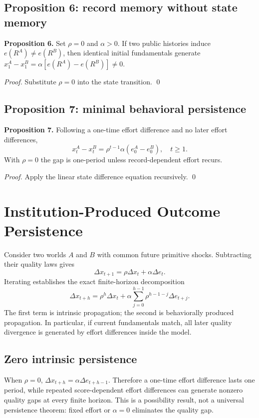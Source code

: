 \subsection{Proposition 6: record memory without state memory}
\textbf{Proposition 6.} Set $\rho=0$ and $\alpha>0$. If two public histories induce $e(R^A)\ne e(R^B)$, then identical initial fundamentals generate $x_1^A-x_1^B=\alpha[e(R^A)-e(R^B)]\ne0$.

\textit{Proof.} Substitute $\rho=0$ into the state transition. \qed

\subsection{Proposition 7: minimal behavioral persistence}
\textbf{Proposition 7.} Following a one-time effort difference and no later effort differences,
\[
x_t^A-x_t^B=\rho^{t-1}\alpha(e_0^A-e_0^B),\quad t\ge1.
\]
With $\rho=0$ the gap is one-period unless record-dependent effort recurs.

\textit{Proof.} Apply the linear state difference equation recursively. \qed

\section{Institution-Produced Outcome Persistence}

Consider two worlds $A$ and $B$ with common future primitive shocks. Subtracting their quality laws gives
\[
\Delta x_{t+1}=\rho\Delta x_t+\alpha\Delta e_t.
\]
Iterating establishes the exact finite-horizon decomposition
\[
\Delta x_{t+h}=\rho^h\Delta x_t+
\alpha\sum_{j=0}^{h-1}\rho^{h-1-j}\Delta e_{t+j}.
\]
The first term is intrinsic propagation; the second is behaviorally produced propagation. In particular, if current fundamentals match, all later quality divergence is generated by effort differences inside the model.

\subsection{Zero intrinsic persistence}

When $\rho=0$, $\Delta x_{t+h}=\alpha\Delta e_{t+h-1}$. Therefore a one-time effort difference lasts one period, while repeated score-dependent effort differences can generate nonzero quality gaps at every finite horizon. This is a possibility result, not a universal persistence theorem: fixed effort or $\alpha=0$ eliminates the quality gap.


